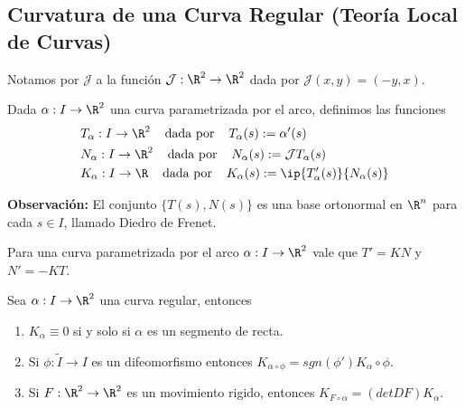 \documentclass{article}
\begin{document}
\subsection{Curvatura de una Curva Regular (Teoría Local de Curvas)}

\begin{dfn}
    Notamos por $\mathcal{J}$ a la función $\mathcal{J}:\R^{2}\to\R^{2}$ dada por 
    $\mathcal{J}(x,y)=(-y,x)$.
\end{dfn}

\begin{dfn}
    Dada $\alpha: I\to\R^{2}$ una curva parametrizada por el arco, definimos las funciones
    \begin{align*}
        & T_{\alpha}: I\to\R^{2}\hspace{4mm}\text{dada por}\hspace{4mm}
        T_{\alpha}(s):=\alpha'(s) \\
        & N_{\alpha}: I\to\R^{2}\hspace{4mm}\text{dada por}\hspace{4mm}
        N_{\alpha}(s):=\mathcal{J}T_{\alpha}(s) \\
        & K_{\alpha}: I\to\R\hspace{4mm}\text{dada por}\hspace{4mm}
        K_{\alpha}(s):=\ip{T'_{\alpha}(s)}{N_{\alpha}(s)}
    \end{align*}
\end{dfn}
\noindent\textbf{Observación:} El conjunto $\{T(s),N(s)\}$ es una base ortonormal en $\R^{n}$ para 
cada $s\in I$, llamado Diedro de Frenet.

\begin{prop}
    Para una curva parametrizada por el arco $\alpha: I\to\R^{2}$ vale que $T'=KN$ y $N'=-KT$.
\end{prop}

\begin{prop}
    Sea $\alpha: I\to\R^{2}$ una curva regular, entonces
    \begin{enumerate}
        \item $K_{\alpha}\equiv0$ si y solo si $\alpha$ es un segmento de recta.

        \item Si $\phi:\widetilde{I}\to I$ es un difeomorfismo entonces $K_{\alpha\circ\phi}=
        sgn(\phi')K_{\alpha}\circ\phi$.
        
        \item Si $F:\R^{2}\to\R^{2}$ es un movimiento rigido, entonces $K_{F\circ\alpha}=
        (detDF)K_{\alpha}$.
    \end{enumerate}
\end{prop}
\end{document}
